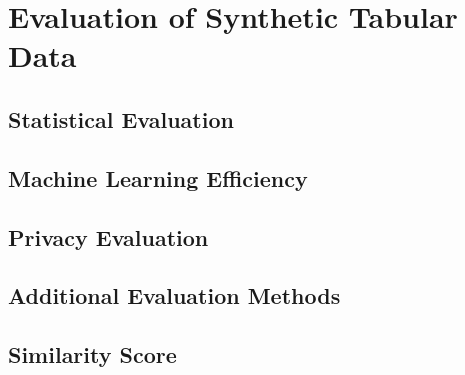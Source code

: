 \section{Evaluation of Synthetic Tabular Data}
\label{ch:preliminaries-evaluationOfSyntheticTabularData}


\subsection{Statistical Evaluation}
\label{ch:preliminaries-evaluationOfSyntheticTabularData-statisticalEvaluation}

\subsection{Machine Learning Efficiency}
\label{ch:preliminaries-evaluationOfSyntheticTabularData-machineLearningEfficiency}

\subsection{Privacy Evaluation}
\label{ch:preliminaries-evaluationOfSyntheticTabularData-privacyEvaluation}

\subsection{Additional Evaluation Methods}
\label{ch:preliminaries-evaluationOfSyntheticTabularData-otherMetrics}


\subsection{Similarity Score}
\label{ch:preliminaries-evaluationOfSyntheticTabularData-similarityScore}






